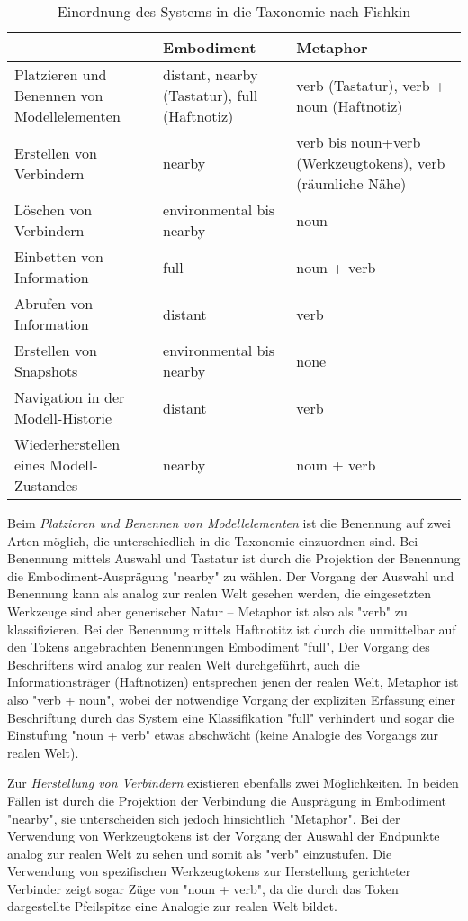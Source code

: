 	\begin{longtable}{| p{6cm} || p{3cm} | p{3cm} |} \caption{Einordnung des Systems in die Taxonomie nach Fishkin}
	\label{tab:einordnungFishkin}
	\\ \hline
		 & Embodiment & Metaphor \\ \hline \hline
		Platzieren und Benennen von Modellelementen & distant, nearby (Tastatur), full (Haftnotiz) & verb (Tastatur), verb + noun (Haftnotiz) \\ \hline
		Erstellen von Verbindern & nearby & verb bis noun+verb (Werkzeugtokens), verb (räumliche Nähe)\\ \hline
		Löschen von Verbindern & environmental bis nearby & noun \\ \hline
		Einbetten von Information & full & noun + verb \\ \hline
		Abrufen von Information & distant & verb \\ \hline
		Erstellen von Snapshots & environmental bis nearby & none \\ \hline
		Navigation in der Modell-Historie & distant & verb \\ \hline
		Wiederherstellen eines Modell-Zustandes & nearby & noun + verb\\ \hline		
	\end{longtable}

Beim \emph{Platzieren und Benennen von Modellelementen} ist die Benennung auf zwei Arten möglich, die unterschiedlich in die Taxonomie einzuordnen sind. Bei Benennung mittels Auswahl und Tastatur ist durch die Projektion der Benennung die Embodiment-Ausprägung "nearby" zu wählen. Der Vorgang der Auswahl und Benennung kann als analog zur realen Welt gesehen werden, die eingesetzten Werkzeuge sind aber generischer Natur -- Metaphor ist also als "verb" zu klassifizieren. Bei der Benennung mittels Haftnotitz ist durch die unmittelbar auf den Tokens angebrachten Benennungen Embodiment "full", Der Vorgang des Beschriftens wird analog zur realen Welt durchgeführt, auch die Informationsträger (Haftnotizen) entsprechen jenen der realen Welt, Metaphor ist also "verb + noun", wobei  der notwendige Vorgang der expliziten Erfassung einer Beschriftung durch das System eine Klassifikation "full" verhindert und sogar die Einstufung "noun + verb" etwas abschwächt (keine Analogie des Vorgangs zur realen Welt).

Zur \emph{Herstellung von Verbindern} existieren ebenfalls zwei Möglichkeiten. In beiden Fällen ist durch die Projektion der Verbindung die Ausprägung in Embodiment "nearby", sie unterscheiden sich jedoch hinsichtlich "Metaphor". Bei der Verwendung von Werkzeugtokens ist der Vorgang der Auswahl der Endpunkte analog zur realen Welt zu sehen und somit als "verb" einzustufen. Die Verwendung von spezifischen Werkzeugtokens zur Herstellung gerichteter Verbinder zeigt sogar Züge von "noun + verb", da die durch das Token dargestellte Pfeilspitze eine Analogie zur realen Welt bildet.

